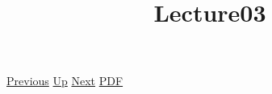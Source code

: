 \documentclass[12pt,a4paper]{report}
\begin{document}
 \href{doc/phil/People/Brandom/Antirepresentationalism/Lecture02.html}{Previous} 
 \href{doc/phil/People/Brandom/Antirepresentationalism.html}{Up} 
 \href{doc/phil/People/Brandom/Antirepresentationalism/Lecture04.html}{Next} 
 \href{doc/phil/People/Brandom/Antirepresentationalism/Lecture03.pdf}{PDF} 
\title{Lecture03}

\tableofcontents
\end{document}
